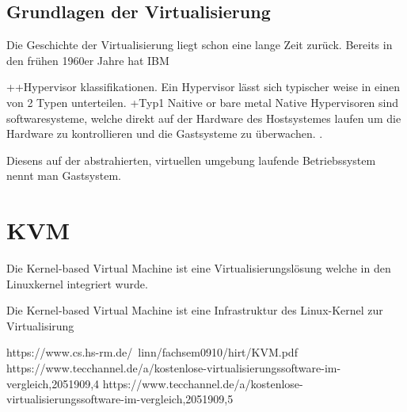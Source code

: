 \documentclass[14pt]{extreport}
\begin{document}
\section{Grundlagen der Virtualisierung}


Die Geschichte der Virtualisierung liegt schon eine lange Zeit zurück. Bereits in den frühen 1960er Jahre hat IBM 








++Hypervisor klassifikationen.
Ein Hypervisor lässt sich typischer weise in einen von 2 Typen unterteilen.
+Typ1 Naitive or bare metal
Native Hypervisoren sind softwaresysteme, welche direkt auf der Hardware des Hostsystemes laufen um die Hardware zu kontrollieren und die Gastsysteme zu überwachen. . 


Diesens auf der abstrahierten, virtuellen umgebung laufende Betriebssystem nennt man Gastsystem.



\chapter{KVM}
Die Kernel-based Virtual Machine ist eine Virtualisierungslösung welche in den Linuxkernel integriert wurde. 

Die Kernel-based Virtual Machine ist eine Infrastruktur des Linux-Kernel zur Virtualisirung 


https://www.cs.hs-rm.de/~linn/fachsem0910/hirt/KVM.pdf
https://www.tecchannel.de/a/kostenlose-virtualisierungssoftware-im-vergleich,2051909,4
https://www.tecchannel.de/a/kostenlose-virtualisierungssoftware-im-vergleich,2051909,5

\printbibliography
\end{document}
